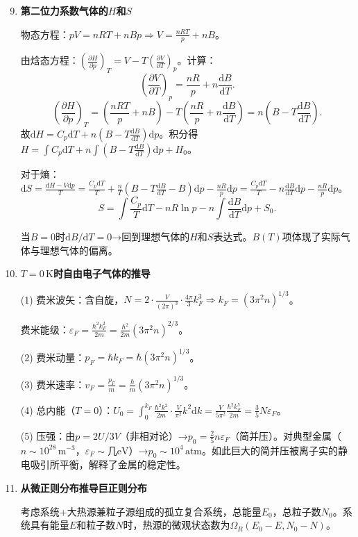 \documentclass[12pt,a4paper,fontset=mac]{ctexart}
\newcommand{\dd}{\mathrm{d}}
\newcommand{\đ}{\mathrm{đ}}
\begin{document}
\begin{enumerate}
\setcounter{enumi}{8}

\item \textbf{第二位力系数气体的$H$和$S$}

物态方程：$pV=nRT+nBp\Rightarrow V=\frac{nRT}{p}+nB$。

由焓态方程：$\left(\frac{\partial H}{\partial p}\right)_T=V-T\left(\frac{\partial V}{\partial T}\right)_p$。计算：
\[\left(\frac{\partial V}{\partial T}\right)_p=\frac{nR}{p}+n\frac{\dd B}{\dd T}.\]
\[\left(\frac{\partial H}{\partial p}\right)_T=\left(\frac{nRT}{p}+nB\right)-T\left(\frac{nR}{p}+n\frac{\dd B}{\dd T}\right)=n\left(B-T\frac{\dd B}{\dd T}\right).\]
故$\dd H=C_p\dd T+n\left(B-T\frac{\dd B}{\dd T}\right)\dd p$。积分得$H=\int C_p\dd T+n\int\left(B-T\frac{\dd B}{\dd T}\right)\dd p+H_0$。

对于熵：$\dd S=\frac{\dd H-V\dd p}{T}=\frac{C_p\dd T}{T}+\frac{n}{T}\left(B-T\frac{\dd B}{\dd T}-B\right)\dd p-\frac{nR}{p}\dd p=\frac{C_p\dd T}{T}-n\frac{\dd B}{\dd T}\dd p-\frac{nR}{p}\dd p$。
\[S=\int\frac{C_p}{T}\dd T-nR\ln p-n\int\frac{\dd B}{\dd T}\dd p+S_0.\]

当$B=0$时$\dd B/\dd T=0$→回到理想气体的$H$和$S$表达式。$B(T)$项体现了实际气体与理想气体的偏离。

\item \textbf{$T=0\,\text{K}$时自由电子气体的推导}

(1) 费米波矢：含自旋，$N=2\cdot\frac{V}{(2\pi)^3}\cdot\frac{4\pi}{3}k_F^3\Rightarrow\boxed{k_F=(3\pi^2n)^{1/3}}$。

费米能级：$\boxed{\varepsilon_F=\frac{\hbar^2k_F^2}{2m}=\frac{\hbar^2}{2m}(3\pi^2n)^{2/3}}$。

(2) 费米动量：$\boxed{p_F=\hbar k_F=\hbar(3\pi^2n)^{1/3}}$。

(3) 费米速率：$\boxed{v_F=\frac{p_F}{m}=\frac{\hbar}{m}(3\pi^2n)^{1/3}}$。

(4) 总内能（$T=0$）：$U_0=\int_0^{k_F}\frac{\hbar^2k^2}{2m}\cdot\frac{V}{\pi^2}k^2\dd k=\frac{V}{5\pi^2}\frac{\hbar^2k_F^5}{2m}=\boxed{\frac{3}{5}N\varepsilon_F}$。

(5) 压强：由$p=2U/3V$（非相对论）→$p_0=\frac{2}{5}n\varepsilon_F$（简并压）。对典型金属（$n\sim10^{28}\,\text{m}^{-3}$，$\varepsilon_F\sim\text{几eV}$）→$p_0\sim10^4\,\text{atm}$。如此巨大的简并压被离子实的静电吸引所平衡，解释了金属的稳定性。

\item \textbf{从微正则分布推导巨正则分布}

考虑系统+大热源兼粒子源组成的孤立复合系统，总能量$E_0$，总粒子数$N_0$。系统具有能量$E$和粒子数$N$时，热源的微观状态数为$\Omega_R(E_0-E, N_0-N)$。


\end{enumerate}
\end{document}

